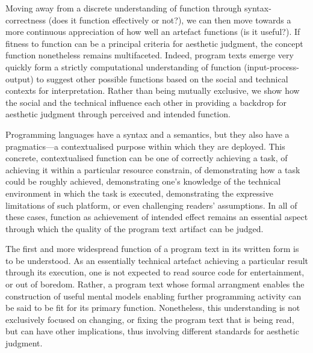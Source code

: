 Moving away from a discrete understanding of function through syntax-correctness (does it function effectively or not?), we can then move towards a more continuous appreciation of how well an artefact functions (is it useful?). If fitness to function can be a principal criteria for aesthetic judgment, the concept function nonetheless remains multifaceted. Indeed, program texts emerge very quickly form a strictly computational understanding of function (input-process-output) to suggest other possible functions based on the social and technical contexts for interpretation. Rather than being mutually exclusive, we show how the social and the technical influence each other in providing a backdrop for aesthetic judgment through perceived and intended function.

Programming languages have a syntax and a semantics, but they also have a pragmatics—a contextualised purpose within which they are deployed. This concrete, contextualised function can be one of correctly achieving a task, of achieving it within a particular resource constrain, of demonstrating how a task could be roughly achieved, demonstrating one's knowledge of the technical environment in which the task is executed, demonstrating the expressive limitations of such platform, or even challenging readers' assumptions. In all of these cases, function as achievement of intended effect remains an essential aspect through which the quality of the program text artifact can be judged.

The first and more widespread function of a program text in its written form is to be understood. As an essentially technical artefact achieving a particular result through its execution, one is not expected to read source code for entertainment, or out of boredom. Rather, a program text whose formal arrangment enables the construction of useful mental models enabling further programming activity can be said to be fit for its primary function. Nonetheless, this understanding is not exclusively focused on changing, or fixing the program text that is being read, but can have other implications, thus involving different standards for aesthetic judgment.

